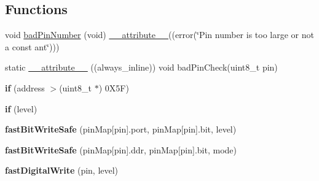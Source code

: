 \subsection*{Functions}
\begin{DoxyCompactItemize}
\item 
void \hyperlink{group__digital_pin_ga6a94475a4246cb2279a1b6d1090f84ac}{bad\-Pin\-Number} (void) \hyperlink{group__digital_pin_ga5589cd85aa7f8bf2b29ba1541eeb7103}{\-\_\-\-\_\-attribute\-\_\-\-\_\-}((error(\char`\"{}Pin number is too large or not a const ant\char`\"{})))
\item 
static \hyperlink{group__digital_pin_ga5589cd85aa7f8bf2b29ba1541eeb7103}{\-\_\-\-\_\-attribute\-\_\-\-\_\-} ((always\-\_\-inline)) void bad\-Pin\-Check(uint8\-\_\-t pin)
\item 
\hypertarget{group__digital_pin_gad7db1200cb344310c564a5ba81165d94}{{\bfseries if} (address $>$(uint8\-\_\-t $\ast$) 0\-X5\-F)}\label{group__digital_pin_gad7db1200cb344310c564a5ba81165d94}

\item 
\hypertarget{group__digital_pin_ga4adc306038cf7fb6fd42255194822fb3}{{\bfseries if} (level)}\label{group__digital_pin_ga4adc306038cf7fb6fd42255194822fb3}

\item 
\hypertarget{group__digital_pin_gad0ab504cdbfd3a66329b31037d9ff281}{{\bfseries fast\-Bit\-Write\-Safe} (pin\-Map\mbox{[}pin\mbox{]}.port, pin\-Map\mbox{[}pin\mbox{]}.bit, level)}\label{group__digital_pin_gad0ab504cdbfd3a66329b31037d9ff281}

\item 
\hypertarget{group__digital_pin_ga251e643b0e2a8cb7e5925ea6c9181c78}{{\bfseries fast\-Bit\-Write\-Safe} (pin\-Map\mbox{[}pin\mbox{]}.ddr, pin\-Map\mbox{[}pin\mbox{]}.bit, mode)}\label{group__digital_pin_ga251e643b0e2a8cb7e5925ea6c9181c78}

\item 
\hypertarget{group__digital_pin_ga17778c1e9b0443c03cf406e4dcdcd78e}{{\bfseries fast\-Digital\-Write} (pin, level)}\label{group__digital_pin_ga17778c1e9b0443c03cf406e4dcdcd78e}

\end{DoxyCompactItemize}
